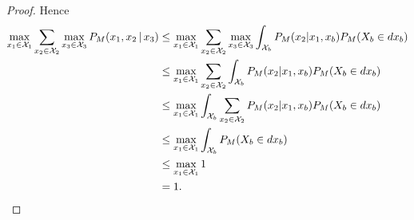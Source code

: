 \begin{proof}
  Hence
  \begin{equation*}\begin{split}
    \max_{x_1\in\mathcal{X}_1} \sum_{x_2\in\mathcal{X}_2} \max_{x_3\in\mathcal{X}_3} P_M(x_1,x_2 \operatorname*{|} x_3) 
    & \le \max_{x_1\in\mathcal{X}_1} \sum_{x_2\in\mathcal{X}_2} \max_{x_3\in\mathcal{X}_3} \int_{\mathcal{X}_b} P_M(x_2|x_1,x_b) P_M(X_b \in dx_b) \\
    & \le \max_{x_1\in\mathcal{X}_1} \sum_{x_2\in\mathcal{X}_2} \int_{\mathcal{X}_b} P_M(x_2|x_1,x_b) P_M(X_b \in dx_b) \\
    & \le \max_{x_1\in\mathcal{X}_1} \int_{\mathcal{X}_b} \sum_{x_2\in\mathcal{X}_2} P_M(x_2|x_1,x_b) P_M(X_b \in dx_b) \\
    & \le \max_{x_1\in\mathcal{X}_1} \int_{\mathcal{X}_b} P_M(X_b \in dx_b) \\
    & \le \max_{x_1\in\mathcal{X}_1} 1 \\
    & = 1.
  \end{split}\end{equation*}
\end{proof}
